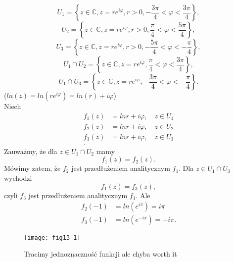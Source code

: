 \documentclass[../main.tex]{subfiles}
\begin{document}
\begin{przyklad}
    \[
        U_1 = \left\{ z\in\mathbb{C}, z = re^{i\varphi}, r > 0, -\frac{3\pi}{4} < \varphi < \frac{3\pi}{4}\right\}
    ,\]
    \[
        U_2 = \left\{ z\in\mathbb{C}, z = re^{i\varphi}, r > 0, \frac{\pi}{4} < \varphi < \frac{5\pi}{4}\right\}
    ,\]
    \[
        U_3 = \left\{ z\in\mathbb{C}, z = re^{i\varphi}, r > 0, -\frac{5\pi}{4} < \varphi < -\frac{\pi}{4}\right\}
    ,\]
    \[
        U_1 \cap U_2 = \left\{ z\in\mathbb{C}, z = re^{i\varphi}, \frac{\pi}{4} < \varphi < \frac{3\pi}{4} \right\}
    ,\]
    \[
        U_1 \cap U_3 = \left\{ z\in\mathbb{C}, z = re^{i\varphi}, -\frac{3\pi}{4} < \varphi < -\frac{\pi}{4} \right\}
    .\]
($ln(z) = ln(re^{i\varphi}) = ln(r) + i\varphi$)\\
    Niech
    \begin{align*}
        f_1(z) &= ln r + i\varphi,\quad z\in U_1\\
        f_2(z) &= ln r + i\varphi,\quad z\in U_2\\
        f_3(z) &= ln r + i\varphi,\quad z\in U_3\\
    .\end{align*}
    Zauważmy, że dla $z\in U_1\cap U_2$ mamy
    \[
        f_1(z) = f_2(z)
    .\]
Mówimy zatem, że $f_2$ jest przedłużeniem analitycznym $f_1$. Dla $z\in U_1\cap U_3$ wychodzi
    \[
        f_1(z) = f_3(z)
    ,\]
czyli $f_3$ jest przedłużeniem analitycznym $f_1$. Ale
    \begin{align*}
        f_2(-1) &= ln (e^{i\pi}) = i\pi\\
        f_3(-1) &= ln (e^{-i\pi}) = -i\pi
    .\end{align*}
    \begin{figure}[h]
        \centering
        \texttt{[image: fig13-1]}
        \caption{Tracimy jednoznaczność funkcji ale chyba worth it}
    \end{figure}
\end{przyklad}
\end{document}
